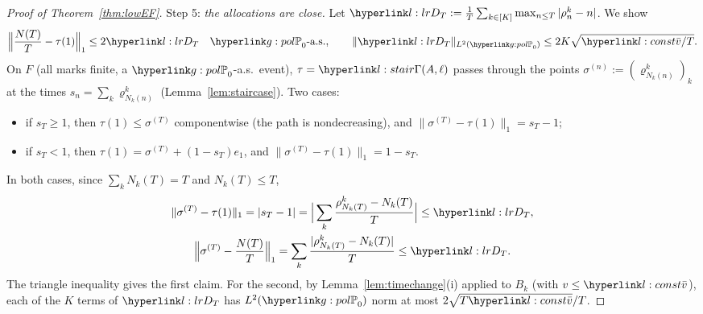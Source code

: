 \documentclass[11pt]{article}
\newcommand{\1}{\mathbf{1}}
\begin{document}
\begin{proof}[Proof of Theorem~\ref{thm:lowEF}]
Step 5: \emph{the allocations are close.} Let $\lDT:=\frac1T\sum_{k\in[K]}\max_{n\le T}|\rho^k_n-n|$. We show
\begin{equation}\label{eq:low-alloc}
\Big\|\frac{N(T)}T-\tau(1)\Big\|_1\le2\lDT\quad\gPh_0\text{-a.s.},\qquad \|\lDT\|_{L^2(\gPh_0)}\le2K\sqrt{\lvb/T}.
\end{equation}
On $F$ (all marks finite, a $\gPh_0$-a.s.\ event), $\tau=\lGam(A,\ell)$ passes through the points $\sigma^{(n)}:=(\varrho^k_{N_k(n)})_k$ at the times
$s_n=\sum_k\varrho^k_{N_k(n)}$ (Lemma~\ref{lem:staircase}). Two cases:
\begin{itemize}
\item if $s_T\ge1$, then $\tau(1)\le\sigma^{(T)}$ componentwise (the path is nondecreasing), and $\|\sigma^{(T)}-\tau(1)\|_1=s_T-1$;
\item if $s_T<1$, then $\tau(1)=\sigma^{(T)}+(1-s_T)e_1$, and $\|\sigma^{(T)}-\tau(1)\|_1=1-s_T$.
\end{itemize}
In both cases, since $\sum_kN_k(T)=T$ and $N_k(T)\le T$,
\begin{gather*}
\|\sigma^{(T)}-\tau(1)\|_1=|s_T-1|=\Big|\sum_k\frac{\rho^k_{N_k(T)}-N_k(T)}T\Big|\le\lDT,\\
\Big\|\sigma^{(T)}-\frac{N(T)}T\Big\|_1=\sum_k\frac{|\rho^k_{N_k(T)}-N_k(T)|}T\le\lDT .
\end{gather*}
The triangle inequality gives the first claim. For the second, by Lemma~\ref{lem:timechange}(i) applied to $B_k$ (with $v\le\lvb$), each of the $K$ terms of $\lDT$ has
$L^2(\gPh_0)$ norm at most $2\sqrt{T\lvb}/T$.


\end{proof}
\end{document}
